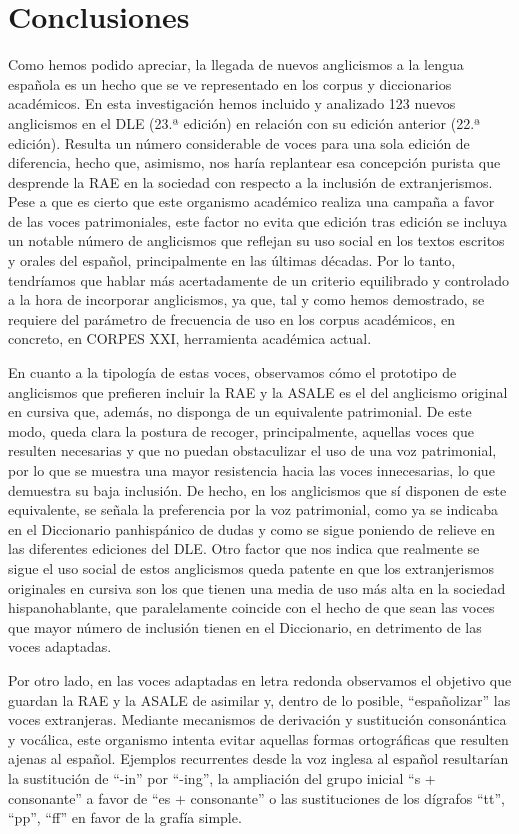 \documentclass{textolivre}
\begin{document}
\section{Conclusiones}\label{sec-conclusiones}
Como hemos podido apreciar, la llegada de nuevos anglicismos a la lengua española es un hecho que se ve representado en los corpus y diccionarios académicos. En esta investigación hemos incluido y analizado 123 nuevos anglicismos en el DLE (23.ª edición) en relación con su edición anterior (22.ª edición). Resulta un número considerable de voces para una sola edición de diferencia, hecho que, asimismo, nos haría replantear esa concepción purista que desprende la RAE en la sociedad con respecto a la inclusión de extranjerismos. Pese a que es cierto que este organismo académico realiza una campaña a favor de las voces patrimoniales, este factor no evita que edición tras edición se incluya un notable número de anglicismos que reflejan su uso social en los textos escritos y orales del español, principalmente en las últimas décadas. Por lo tanto, tendríamos que hablar más acertadamente de un criterio equilibrado y controlado a la hora de incorporar anglicismos, ya que, tal y como hemos demostrado, se requiere del parámetro de frecuencia de uso en los corpus académicos, en concreto, en CORPES XXI, herramienta académica actual.

En cuanto a la tipología de estas voces, observamos cómo el prototipo de anglicismos que prefieren incluir la RAE y la ASALE es el del anglicismo original en cursiva que, además, no disponga de un equivalente patrimonial. De este modo, queda clara la postura de recoger, principalmente, aquellas voces que resulten necesarias y que no puedan obstaculizar el uso de una voz patrimonial, por lo que se muestra una mayor resistencia hacia las voces innecesarias, lo que demuestra su baja inclusión. De hecho, en los anglicismos que sí disponen de este equivalente, se señala la preferencia por la voz patrimonial, como ya se indicaba en el Diccionario panhispánico de dudas y como se sigue poniendo de relieve en las diferentes ediciones del DLE. Otro factor que nos indica que realmente se sigue el uso social de estos anglicismos queda patente en que los extranjerismos originales en cursiva son los que tienen una media de uso más alta en la sociedad hispanohablante, que paralelamente coincide con el hecho de que sean las voces que mayor número de inclusión tienen en el Diccionario, en detrimento de las voces adaptadas.

Por otro lado, en las voces adaptadas en letra redonda observamos el objetivo que guardan la RAE y la ASALE de asimilar y, dentro de lo posible, “españolizar” las voces extranjeras. Mediante mecanismos de derivación y sustitución consonántica y vocálica, este organismo intenta evitar aquellas formas ortográficas que resulten ajenas al español. Ejemplos recurrentes desde la voz inglesa al español resultarían la sustitución de “-in” por “-ing”, la ampliación del grupo inicial “s + consonante” a favor de “es + consonante” o las sustituciones de los dígrafos “tt”, “pp”, “ff” en favor de la grafía simple.
\end{document}
